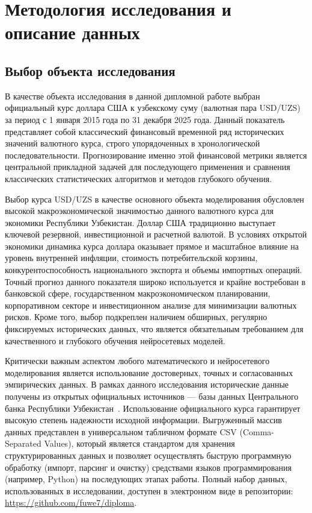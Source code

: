 \chapter{Методология исследования и описание данных}

\section{Выбор объекта исследования}
В качестве объекта исследования в данной дипломной работе выбран официальный курс доллара США к узбекскому суму (валютная пара USD/UZS) за период с 1 января 2015 года по 31 декабря 2025 года. Данный показатель представляет собой классический финансовый временной ряд исторических значений валютного курса, строго упорядоченных в хронологической последовательности. Прогнозирование именно этой финансовой метрики является центральной прикладной задачей для последующего применения и сравнения классических статистических алгоритмов и методов глубокого обучения.

Выбор курса USD/UZS в качестве основного объекта моделирования обусловлен высокой макроэкономической значимостью данного валютного курса для экономики Республики Узбекистан. Доллар США традиционно выступает ключевой резервной, инвестиционной и расчетной валютой. В условиях открытой экономики динамика курса доллара оказывает прямое и масштабное влияние на уровень внутренней инфляции, стоимость потребительской корзины, конкурентоспособность национального экспорта и объемы импортных операций. Точный прогноз данного показателя широко используется и крайне востребован в банковской сфере, государственном макроэкономическом планировании, корпоративном секторе и инвестиционном анализе для минимизации валютных рисков. Кроме того, выбор подкреплен наличием обширных, регулярно фиксируемых исторических данных, что является обязательным требованием для качественного и глубокого обучения нейросетевых моделей.

Критически важным аспектом любого математического и нейросетевого моделирования является использование достоверных, точных и согласованных эмпирических данных. В рамках данного исследования исторические данные получены из открытых официальных источников — базы данных Центрального банка Республики Узбекистан~\cite{cbu_rates}. Использование официального курса гарантирует высокую степень надежности исходной информации. Выгруженный массив данных представлен в универсальном табличном формате CSV (Comma-Separated Values), который является стандартом для хранения структурированных данных и позволяет осуществлять быструю программную обработку (импорт, парсинг и очистку) средствами языков программирования (например, Python) на последующих этапах работы.
Полный набор данных, использованных в исследовании, доступен в электронном виде в репозитории: \url{https://github.com/fuwe7/diploma}.

